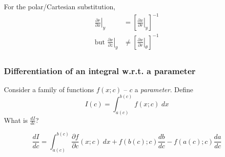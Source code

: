 \documentclass{../../template/note}
\begin{document}
    \begin{example}
        For the polar/Cartesian substitution,
        \begin{align*}
            \left.\frac{\partial r}{\partial x}\right|_{y} &= \left[\left.\frac{\partial x}{\partial r}\right|_{y}\right]^{-1} \\
            \text{but } \left.\frac{\partial x}{\partial z}\right|_{y} &\neq \left[\left.\frac{\partial x}{\partial r}\right|_{\theta}\right]^{-1} \\
        \end{align*}
    \end{example}
    
    \subsubsection{Differentiation of an integral w.r.t. a parameter}

    Consider a family of functions \(f(x; c)\) -- \(c\) a \emph{parameter}. Define
    \[
        I(c) = \int_{a(c)}^{b(c)} f(x; c) \; dx
    \]
    What is \(\frac{dI}{dc}\)?

    \begin{theorem}
        \[
            \frac{dI}{dc} = \int_{a(c)}^{b(c)} \frac{\partial f}{\partial c}(x; c) \; dx + f(b(c); c)\frac{db}{dc} - f(a(c); c) \frac{da}{dc}
        \]
    \end{theorem}
    
\end{document}
